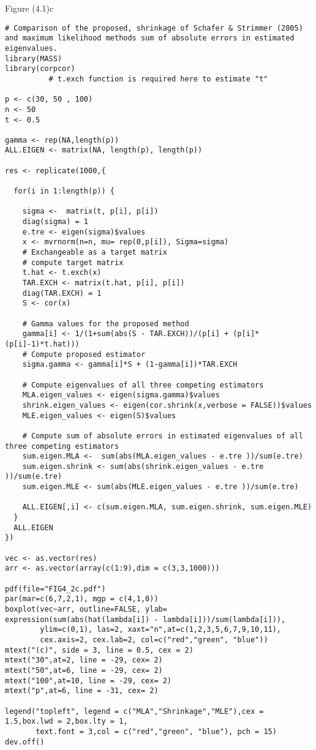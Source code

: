Figure (4.1)c
\begin{lstlisting}
# Comparison of the proposed, shrinkage of Schafer & Strimmer (2005) and maximum likelihood methods sum of absolute errors in estimated eigenvalues.
library(MASS)
library(corpcor)
          # t.exch function is required here to estimate "t"
 
p <- c(30, 50 , 100)
n <- 50
t <- 0.5

gamma <- rep(NA,length(p))
ALL.EIGEN <- matrix(NA, length(p), length(p))

res <- replicate(1000,{
  
  for(i in 1:length(p)) {
    
    sigma <-  matrix(t, p[i], p[i])
    diag(sigma) = 1
    e.tre <- eigen(sigma)$values
    x <- mvrnorm(n=n, mu= rep(0,p[i]), Sigma=sigma)
    # Exchangeable as a target matrix
    # compute target matrix
    t.hat <- t.exch(x)
    TAR.EXCH <- matrix(t.hat, p[i], p[i])
    diag(TAR.EXCH) = 1
    S <- cor(x)
    
    # Gamma values for the proposed method
    gamma[i] <- 1/(1+sum(abs(S - TAR.EXCH))/(p[i] + (p[i]*(p[i]-1)*t.hat)))
    # Compute proposed estimator
    sigma.gamma <- gamma[i]*S + (1-gamma[i])*TAR.EXCH
    
    # Compute eigenvalues of all three competing estimators
    MLA.eigen_values <- eigen(sigma.gamma)$values
    shrink.eigen_values <- eigen(cor.shrink(x,verbose = FALSE))$values
    MLE.eigen_values <- eigen(S)$values
    
    # Compute sum of absolute errors in estimated eigenvalues of all three competing estimators
    sum.eigen.MLA <-  sum(abs(MLA.eigen_values - e.tre ))/sum(e.tre)
    sum.eigen.shrink <- sum(abs(shrink.eigen_values - e.tre ))/sum(e.tre)
    sum.eigen.MLE <- sum(abs(MLE.eigen_values - e.tre ))/sum(e.tre)
    
    ALL.EIGEN[,i] <- c(sum.eigen.MLA, sum.eigen.shrink, sum.eigen.MLE)
  }
  ALL.EIGEN
})

vec <- as.vector(res)
arr <- as.vector(array(c(1:9),dim = c(3,3,1000)))

pdf(file="FIG4_2c.pdf")
par(mar=c(6,7,2,1), mgp = c(4,1,0))
boxplot(vec~arr, outline=FALSE, ylab= expression(sum(abs(hat(lambda[i]) - lambda[i]))/sum(lambda[i])),
        ylim=c(0,1), las=2, xaxt="n",at=c(1,2,3,5,6,7,9,10,11),
        cex.axis=2, cex.lab=2, col=c("red","green", "blue"))
mtext("(c)", side = 3, line = 0.5, cex = 2)
mtext("30",at=2, line = -29, cex= 2)
mtext("50",at=6, line = -29, cex= 2)
mtext("100",at=10, line = -29, cex= 2)
mtext("p",at=6, line = -31, cex= 2)

legend("topleft", legend = c("MLA","Shrinkage","MLE"),cex = 1.5,box.lwd = 2,box.lty = 1,
       text.font = 3,col = c("red","green", "blue"), pch = 15)
dev.off()
\end{lstlisting}

